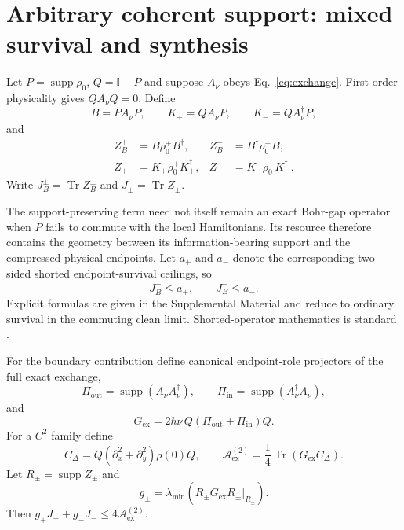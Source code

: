 \documentclass[aps,pra,preprint,nofootinbib]{revtex4-2}
\newcommand{\Tr}{\operatorname{Tr}}
\newcommand{\supp}{\operatorname{supp}}
\newcommand{\id}{\mathbb I}
\newcommand{\rhozero}{\rho_0}
\newcommand{\Aact}{\mathcal A}
\begin{document}
\section{Arbitrary coherent support: mixed survival and synthesis}
\label{sec:mixed}

Let $P=\supp\rhozero$, $Q=\id-P$ and suppose $A_\nu$ obeys Eq.~\eqref{eq:exchange}. First-order physicality gives $QA_\nu Q=0$. Define
\begin{equation}
B=PA_\nu P,\qquad
K_+=QA_\nu P,\qquad
K_-=QA_\nu^\dagger P,
\label{eq:mixed-decomp}
\end{equation}
and
\begin{align}
Z_B^+&=B\rhozero^+B^\dagger,&Z_B^-&=B^\dagger\rhozero^+B,\\
Z_+&=K_+\rhozero^+K_+^\dagger,&Z_-&=K_-\rhozero^+K_-^\dagger.
\end{align}
Write $J_B^\pm=\Tr Z_B^\pm$ and $J_\pm=\Tr Z_\pm$.

The support-preserving term need not itself remain an exact Bohr-gap operator when $P$ fails to commute with the local Hamiltonians. Its resource therefore contains the geometry between its information-bearing support and the compressed physical endpoints. Let $a_+$ and $a_-$ denote the corresponding two-sided shorted endpoint-survival ceilings, so
\begin{equation}
J_B^+\le a_+,
\qquad
J_B^-\le a_-.
\label{eq:a-ceilings}
\end{equation}
Explicit formulas are given in the Supplemental Material and reduce to ordinary survival in the commuting clean limit. Shorted-operator mathematics is standard \cite{AndersonTrapp1975}.

For the boundary contribution define canonical endpoint-role projectors of the full exact exchange,
\begin{equation}
\Pi_{\mathrm{out}}=\supp(A_\nu A_\nu^\dagger),
\qquad
\Pi_{\mathrm{in}}=\supp(A_\nu^\dagger A_\nu),
\label{eq:inout}
\end{equation}
and
\begin{equation}
G_{\mathrm{ex}}=2\hbar\nu\,Q(\Pi_{\mathrm{out}}+\Pi_{\mathrm{in}})Q.
\label{eq:Gex}
\end{equation}
For a $C^2$ family define
\begin{equation}
C_\Delta=Q(\partial_x^2+\partial_y^2)\rho(0)Q,
\qquad
\Aact_{\mathrm{ex}}^{(2)}=\frac14\Tr(G_{\mathrm{ex}}C_\Delta).
\label{eq:Aex}
\end{equation}
Let $R_\pm=\supp Z_\pm$ and
\begin{equation}
g_\pm=\lambda_{\min}\!\left(R_\pm G_{\mathrm{ex}}R_\pm\big|_{R_\pm}\right).
\label{eq:gpm}
\end{equation}
Then $g_+J_+ +g_-J_-\le4\Aact_{\mathrm{ex}}^{(2)}$.
\end{document}
